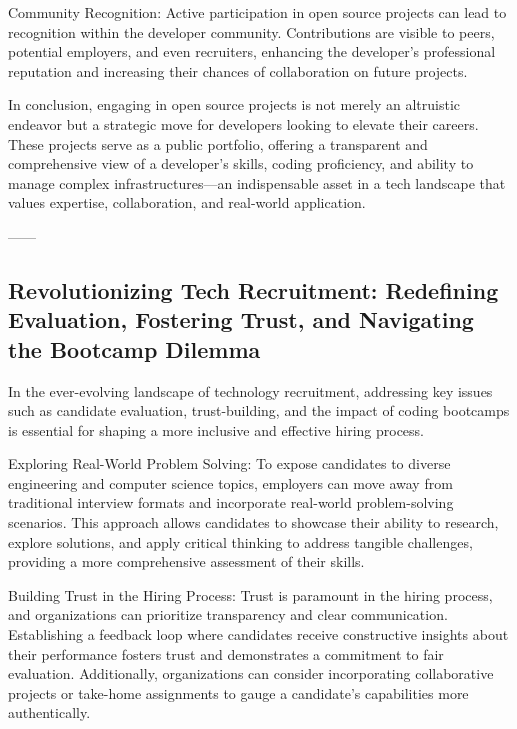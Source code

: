 \documentclass[
    a4paper, %
    10pt, %
    unnumberedsections, %
    twoside, %
]{LTJournalArticle}
\begin{document}
Community Recognition:
Active participation in open source projects can lead to recognition within the developer community. Contributions are visible to peers, potential employers, and even recruiters, enhancing the developer's professional reputation and increasing their chances of collaboration on future projects.

In conclusion, engaging in open source projects is not merely an altruistic endeavor but a strategic move for developers looking to elevate their careers. These projects serve as a public portfolio, offering a transparent and comprehensive view of a developer's skills, coding proficiency, and ability to manage complex infrastructures—an indispensable asset in a tech landscape that values expertise, collaboration, and real-world application.









——

\subsection{Revolutionizing Tech Recruitment: Redefining Evaluation, Fostering Trust, and Navigating the Bootcamp Dilemma}

In the ever-evolving landscape of technology recruitment, addressing key issues such as candidate evaluation, trust-building, and the impact of coding bootcamps is essential for shaping a more inclusive and effective hiring process.

Exploring Real-World Problem Solving:
To expose candidates to diverse engineering and computer science topics, employers can move away from traditional interview formats and incorporate real-world problem-solving scenarios. This approach allows candidates to showcase their ability to research, explore solutions, and apply critical thinking to address tangible challenges, providing a more comprehensive assessment of their skills.

Building Trust in the Hiring Process:
Trust is paramount in the hiring process, and organizations can prioritize transparency and clear communication. Establishing a feedback loop where candidates receive constructive insights about their performance fosters trust and demonstrates a commitment to fair evaluation. Additionally, organizations can consider incorporating collaborative projects or take-home assignments to gauge a candidate's capabilities more authentically.
\end{document}

